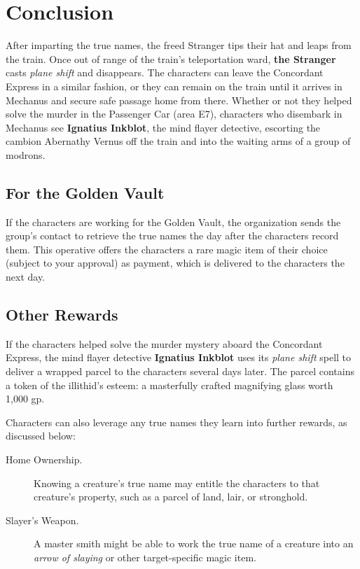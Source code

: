 \documentclass[10pt,a4paper,twoside,bg=print,twocolumn,openany,nodeprecatedcode]{dndbook}
\begin{document}
\section{Conclusion}
After imparting the true names, the freed Stranger tips their hat and leaps from the train. Once out of range of the train's teleportation ward, \textbf{the Stranger} casts \textit{plane shift} and disappears. The characters can leave the Concordant Express in a similar fashion, or they can remain on the train until it arrives in Mechanus and secure safe passage home from there. Whether or not they helped solve the murder in the Passenger Car (area E7), characters who disembark in Mechanus see \textbf{Ignatius Inkblot}, the mind flayer detective, escorting the cambion Abernathy Vernus off the train and into the waiting arms of a group of modrons.

\subsection{For the Golden Vault}
If the characters are working for the Golden Vault, the organization sends the group's contact to retrieve the true names the day after the characters record them. This operative offers the characters a rare magic item of their choice (subject to your approval) as payment, which is delivered to the characters the next day.

\subsection{Other Rewards}
If the characters helped solve the murder mystery aboard the Concordant Express, the mind flayer detective \textbf{Ignatius Inkblot} uses its \textit{plane shift} spell to deliver a wrapped parcel to the characters several days later. The parcel contains a token of the illithid's esteem: a masterfully crafted magnifying glass worth 1,000 gp.

Characters can also leverage any true names they learn into further rewards, as discussed below:


\begin{description}
\item[Home Ownership.]
Knowing a creature's true name may entitle the characters to that creature's property, such as a parcel of land, lair, or stronghold.
\item[Slayer's Weapon.]
A master smith might be able to work the true name of a creature into an \textit{arrow of slaying} or other target-specific magic item.
\end{description}
\end{document}
